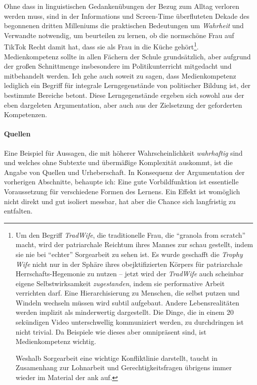 \bigskip

\noindent Ohne dass in linguistischen Gedankenübungen der Bezug zum Alltag verloren werden muss, sind in der Informations und Screen-Time überfluteten Dekade des begonnenen dritten Milleniums die praktischen Bedeutungen um \emph{Wahrheit} und Verwandte notwendig, um beurteilen zu lernen, ob die normschöne Frau auf TikTok Recht damit hat, dass sie als Frau in die Küche gehört\footnote{
    Um den Begriff \emph{TradWife}, die traditionelle Frau, die \enquote{granola from scratch} macht, wird der patriarchale Reichtum ihres Mannes zur schau gestellt, indem sie nie bei \enquote{echter} Sorgearbeit zu sehen ist. Es wurde geschafft die \emph{Trophy Wife} nicht nur in der Sphäre ihres obejktifizierten Körpers für patriarchale Herrschafts-Hegemonie zu nutzen -- jetzt wird der \emph{TradWife} auch scheinbar eigene Selbstwirksamkeit \emph{zugestanden}, indem sie performative Arbeit verrichten darf. Eine Hierarchisierung zu Menschen, die selbst putzen und Windeln wechseln müssen wird subtil aufgebaut. Andere Lebensrealitäten werden implizit als minderwertig dargestellt. Die Dinge, die in einem 20 sekündigen Video unterschwellig kommuniziert werden, zu durchdringen ist nicht trivial. Da Beispiele wie dieses aber omnipräsent sind, ist Medienkompetenz wichtig. 
    
    \noindent Weshalb Sorgearbeit eine wichtige Konfliktlinie darstellt, taucht in Zusamenhang zur Lohnarbeit und Gerechtigkeitsfragen übrigens immer wieder im Material der \gls{ank} auf.
}. 
Medienkompetenz sollte in allen Fächern der Schule grundsätzlich, aber aufgrund der großen Schnittmenge insbesondere im Politikunterricht mitgedacht und mitbehandelt werden. Ich gehe auch soweit zu sagen, dass Medienkompetenz lediglich ein Begriff für integrale Lerngegenstände von politischer Bildung ist, der bestimmte Bereiche betont. Diese Lerngegenstände ergeben sich sowohl aus der eben dargeleten Argumentation, aber auch aus der Zielsetzung der geforderten Kompetenzen. 





\paragraph{Quellen}
Eine Beispiel für Aussagen, die mit höherer Wahrscheinlichkeit \emph{wahrhaftig} sind und welches ohne Subtexte und übermäßige Komplexität auskommt, ist die Angabe von Quellen und Urheberschaft.
In Konsequenz der Argumentation der vorherigen Abschnitte, behaupte ich: Eine gute Vorbildfunktion ist essentielle Voraussetzung für verschiedene Formen des Lernens. %
Ein Effekt ist womöglich nicht direkt und gut isoliert messbar, hat aber die Chance sich langfristig zu entfalten.

